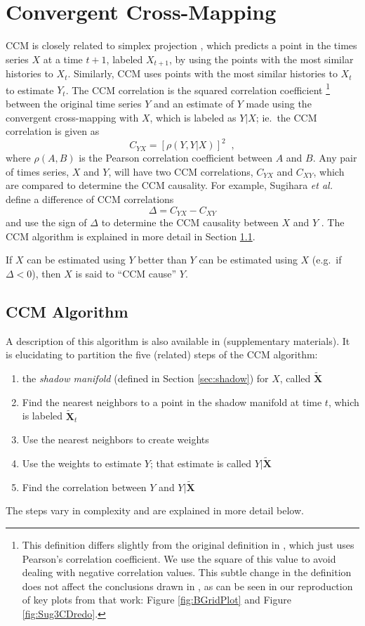 \documentclass[twocolumn,aps,pre,groupedaddress]{revtex4-1}
\begin{document}
\section{Convergent Cross-Mapping}
CCM is closely related to simplex projection \cite{Sugihara1990,Sugihara1990a}, which predicts a point in the times series $X$ at a time $t+1$, labeled $X_{t+1}$, by using the points with the most similar histories to $X_t$.  Similarly, CCM uses points with the most similar histories to $X_t$ to estimate $Y_t$.  The CCM correlation is the squared correlation coefficient \footnote{This definition differs slightly from the original definition in \cite{Sugihara2012}, which just uses Pearson’s correlation coefficient.  We use the square of this value to avoid dealing with negative correlation values.  This subtle change in the definition does not affect the conclusions drawn in \cite{Sugihara2012}, as can be seen in our reproduction of key plots from that work: Figure \ref{fig:BGridPlot} and Figure \ref{fig:Sug3CDredo}.} between the original time series $Y$ and an estimate of $Y$ made using the convergent cross-mapping with $X$, which is labeled as $Y|X$; ie.\ the CCM correlation is given as 
$$
C_{YX} = \left[\rho\left(Y,Y|X\right)\right]^2\;\;,
$$
where $\rho(A,B)$ is the Pearson correlation coefficient between $A$ and $B$.  Any pair of times series, $X$ and $Y$, will have two CCM correlations, $C_{YX}$ and $C_{XY}$, which are compared to determine the CCM causality.  For example, Sugihara {\em et al.\ }\cite{Sugihara2012} define a difference of CCM correlations
\begin{equation}
\label{eqn:delta}
\Delta = C_{YX} - C_{XY}
\end{equation}
and use the sign of $\Delta$ to determine the CCM causality between $X$ and $Y$ \cite{Sugihara2012}.  The CCM algorithm is explained in more detail in Section \ref{sec:appA}.

If $X$ can be estimated using $Y$ better than $Y$ can be estimated using $X$ (e.g.\ if $\Delta < 0$), then $X$ is said to ``CCM cause'' $Y$.

\subsection{CCM Algorithm}
\label{sec:appA}
A description of this algorithm is also available in \cite{Sugihara2012} (supplementary materials).  It is elucidating to partition the five (related) steps of the CCM algorithm:
\begin{enumerate}
\item 
the {\em shadow manifold} (defined in Section \ref{sec:shadow}) for $X$, called $\tilde{\mathbf{X}}$
\item Find the nearest neighbors to a point in the shadow manifold at time $t$, which is labeled $\tilde{\mathbf{X}}_t$
\item Use the nearest neighbors to create weights
\item Use the weights to estimate $Y$; that estimate is called $Y|\tilde{\mathbf{X}}$
\item Find the correlation between $Y$ and $Y|\tilde{\mathbf{X}}$ 
\end{enumerate}
The steps vary in complexity and are explained in more detail below.
\end{document}
